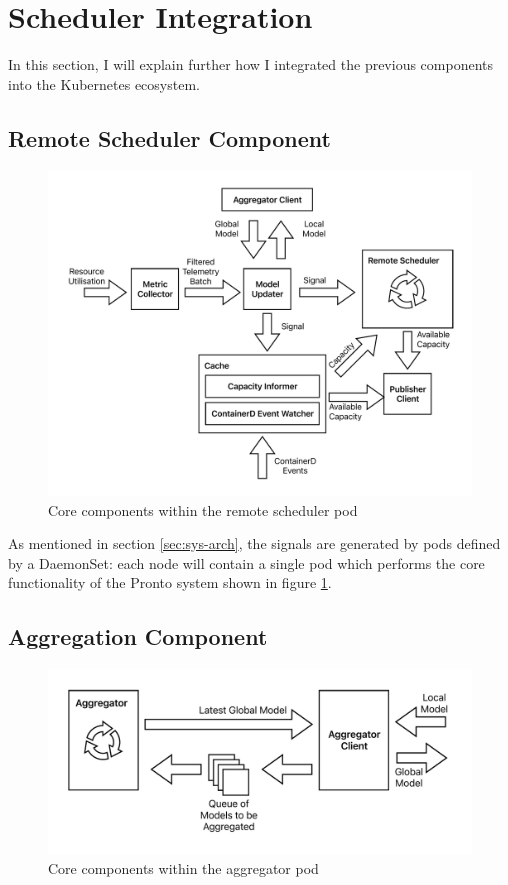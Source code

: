 \section{Scheduler Integration}
In this section, I will explain further how I integrated the previous components into
the Kubernetes ecosystem.

\subsection{Remote Scheduler Component}
\begin{figure}[h]
    \centering
    \includegraphics[width=\textwidth]{images/pronto-pod.pdf}
    \caption{Core components within the remote scheduler pod}
    \label{pronto-pod-components}
\end{figure}
As mentioned in section \ref{sec:sys-arch}, the signals are generated by pods
defined by a DaemonSet: each node will contain a single pod which performs the
core functionality of the Pronto system shown in figure
\ref{pronto-pod-components}.

\subsection{Aggregation Component}
\begin{figure}[h]
    \centering
    \includegraphics[width=\textwidth]{images/pronto-agg.pdf}
    \caption{Core components within the aggregator pod}
    \label{pronto-agg-components}
\end{figure}

